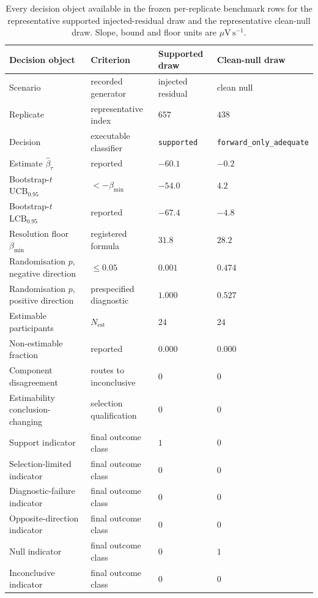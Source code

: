 \begin{table}[H]
\centering
\caption{Every decision object available in the frozen per-replicate benchmark rows for the representative supported injected-residual draw and the representative clean-null draw. Slope, bound and floor units are \(\mu\mathrm{V\,s^{-1}}\).}
\label{tab:si-worked-decision}
\footnotesize
\setlength{\tabcolsep}{3pt}
\begin{tabularx}{\textwidth}{@{}
    >{\raggedright\arraybackslash}p{4.0cm}
    >{\raggedright\arraybackslash}X
    >{\raggedright\arraybackslash}p{3.0cm}
    >{\raggedright\arraybackslash}p{3.0cm}
@{}}
\toprule
Decision object & Criterion & Supported draw & Clean-null draw \\
\midrule
Scenario & recorded generator & injected residual & clean null \\
Replicate & representative index & \(657\) & \(438\) \\
Decision & executable classifier & \texttt{supported} &
\texttt{forward\_\allowbreak only\_\allowbreak adequate} \\
Estimate \(\widehat\beta_\tau\) & reported & \(-60.1\) & \(-0.2\) \\
Bootstrap-\(t\) \(\mathrm{UCB}_{0.95}\) & \(<-\beta_{\min}\) & \(-54.0\) & \(4.2\) \\
Bootstrap-\(t\) \(\mathrm{LCB}_{0.95}\) & reported & \(-67.4\) & \(-4.8\) \\
Resolution floor \(\beta_{\min}\) & registered formula & \(31.8\) & \(28.2\) \\
Randomisation \(p\), negative direction & \(\le 0.05\) & \(0.001\) & \(0.474\) \\
Randomisation \(p\), positive direction & prespecified diagnostic & \(1.000\) & \(0.527\) \\
Estimable participants & \(N_{\mathrm{est}}\) & \(24\) & \(24\) \\
Non-estimable fraction & reported & \(0.000\) & \(0.000\) \\
Component disagreement & routes to inconclusive & \(0\) & \(0\) \\
Estimability conclusion-changing & selection qualification & \(0\) & \(0\) \\
Support indicator & final outcome class & \(1\) & \(0\) \\
Selection-limited indicator & final outcome class & \(0\) & \(0\) \\
Diagnostic-failure indicator & final outcome class & \(0\) & \(0\) \\
Opposite-direction indicator & final outcome class & \(0\) & \(0\) \\
Null indicator & final outcome class & \(0\) & \(1\) \\
Inconclusive indicator & final outcome class & \(0\) & \(0\) \\
\bottomrule
\end{tabularx}
\end{table}
